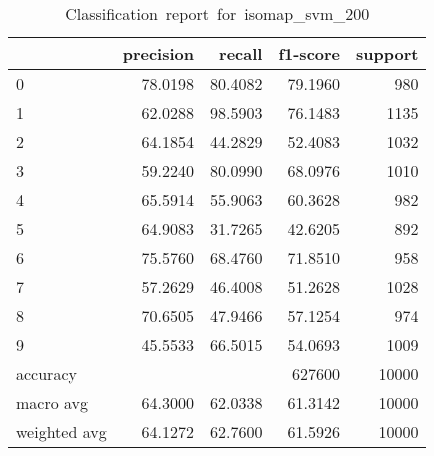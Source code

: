 \begin{table}[htb!]
    \centering
    \begin{tabular}{lrrrr}
        \toprule
                     & precision & recall  & f1-score & support \\
        \midrule
        0            & 78.0198   & 80.4082 & 79.1960  & 980     \\
        1            & 62.0288   & 98.5903 & 76.1483  & 1135    \\
        2            & 64.1854   & 44.2829 & 52.4083  & 1032    \\
        3            & 59.2240   & 80.0990 & 68.0976  & 1010    \\
        4            & 65.5914   & 55.9063 & 60.3628  & 982     \\
        5            & 64.9083   & 31.7265 & 42.6205  & 892     \\
        6            & 75.5760   & 68.4760 & 71.8510  & 958     \\
        7            & 57.2629   & 46.4008 & 51.2628  & 1028    \\
        8            & 70.6505   & 47.9466 & 57.1254  & 974     \\
        9            & 45.5533   & 66.5015 & 54.0693  & 1009    \\
        accuracy     &           &         & 627600   & 10000   \\
        macro avg    & 64.3000   & 62.0338 & 61.3142  & 10000   \\
        weighted avg & 64.1272   & 62.7600 & 61.5926  & 10000   \\
        \bottomrule
    \end{tabular}
    \caption{Classification\ report\ for\ isomap\_svm\_200}
    \label{tab:classification-report-isomap_svm_200}
\end{table}

